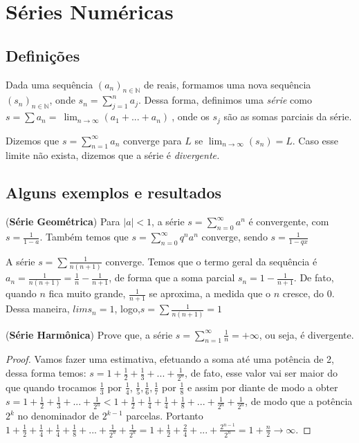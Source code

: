 \section{Séries Numéricas}
\subsection{Definições}
Dada uma sequência $(a_{n})_{n \in \mathbb{N}}$ de reais, formamos uma nova sequência $(s_{n})_{n \in \mathbb{N}}$, onde $s_{n}=\sum_{j=1}^{n}a_{j}$. Dessa forma, definimos uma \textit{série }como $s=\sum a_{n}=\ \lim_{n\to\infty} (a_{1}+...+a_{n}) \ $, onde os $s_{j}$ são as somas parciais da série. 

Dizemos que $s=\sum_{n=1}^{\infty }a_{n}$ converge para $L$ se $\lim_{n\to\infty} (s_{n})=L$. Caso esse limite não exista, dizemos que a série é \textit{divergente.}

\subsection{Alguns exemplos e resultados}

\begin{exem}(\textbf{Série Geométrica})
Para $|a|<1$, a série $s=\sum_{n=0}^{\infty }a^{n}$ é convergente, com $s=\frac{1}{1-a}$. Também temos que $s=\sum_{n=0}^{\infty}q^{n}a^{n}$ converge, sendo $s=\frac{1}{1-qx}$
\end{exem}

\begin{exem}
A série $s=\sum \frac{1}{n(n+1)}$ converge. Temos que o termo geral da sequência é $a_{n}=\frac{1}{n(n+1)}=\frac{1}{n}-\frac{1}{n+1}$, de forma que a soma parcial $s_{n}=1-\frac{1}{n+1}$. De fato, quando $n$ fica muito grande, $\frac{1}{n+1}$ se aproxima, a medida que o $n$ cresce, do 0. Dessa maneira, $lims_{n}=1$, logo,$s=\sum \frac{1}{n(n+1)}=1$
\end{exem}

\begin{prob}(\textbf{Série Harmônica})
Prove que, a série $s=\sum_{n=1}^{\infty} \frac{1}{n}=+\infty$, ou seja, é divergente.
\end{prob}

\begin{proof}
Vamos fazer uma estimativa, efetuando a soma até uma potência de 2, dessa forma temos: $s=1+\frac{1}{2}+\frac{1}{3}+...+\frac{1}{2^{n}}$, de fato, esse valor vai ser maior do que quando trocamos $\frac{1}{3}$ por $\frac{1}{4}$, $\frac{1}{5},\frac{1}{6},\frac{1}{7}$ por $\frac{1}{8}$ e assim por diante de modo a obter $s=1+\frac{1}{2}+\frac{1}{3}+...+\frac{1}{2^{n}} < 1+\frac{1}{2}+\frac{1}{4}+\frac{1}{4}+\frac{1}{8}+...+\frac{1}{2^{n}}+\frac{1}{2^{n}}$, de modo que a potência $2^{k}$ no denominador de   $2^{k-1}$ parcelas. Portanto $1+\frac{1}{2}+\frac{1}{4}+\frac{1}{4}+\frac{1}{8}+...+\frac{1}{2^{n}}+\frac{1}{2^{n}}=1+\frac{1}{2}+\frac{2}{4}+...+\frac{2^{n-1}}{2^{n}}=1+\frac{n}{2}\rightarrow \infty$.
\end{proof}

